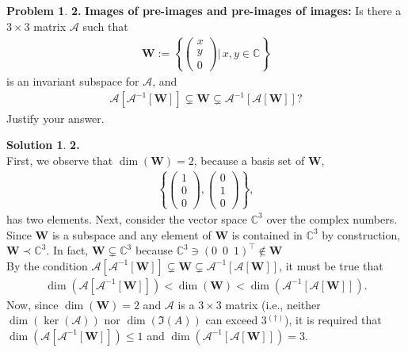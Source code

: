 \documentclass{book}
\theoremstyle{definition}
\newtheorem*{prob*}{Problem}
\newtheorem*{sln*}{Solution}
\newcommand{\W}{\mathbf{W}}
\begin{document}
\newpage
\begin{prob*}\textbf{2.}
	\textbf{Images of pre-images and pre-images of images:} Is there a $3\times 3$ matrix $\mathcal{A}$ such that
	\begin{align*}
	\W := \left\{ \begin{pmatrix}
	x\\y\\0
	\end{pmatrix}\bigg\vert \,x,y\in \mathbb{C} \right\}
	\end{align*}
	is an invariant subspace for $\mathcal{A}$, and
	\begin{align*}
	\mathcal{A}\left[ \mathcal{A}^{-1}[\W] \right] \subsetneq \W \subsetneq \mathcal{A}^{-1}\left[ \mathcal{A}[\W] \right]?
	\end{align*}
	Justify your answer.
	
	
	\begin{sln*}\textbf{2.}
		$\,$\\
		
		\noindent First, we observe that $\dim(\W) = 2$, because a basis set of $\W$,
		\begin{align*}
		\left\{ \begin{pmatrix}
		1\\0\\0
		\end{pmatrix},\begin{pmatrix}
		0\\1\\0
		\end{pmatrix}\right\},
		\end{align*}
		has two elements. Next, consider the vector space $\mathbb{C}^3$ over the complex numbers. Since $\W$ is a subspace and any element of $\W$ is contained in $\mathbb{C}^3$ by construction, $\W \prec \mathbb{C}^3$. In fact, $\W \subsetneq \mathbb{C}^3$ because $\mathbb{C}^3 \ni (0\,\,\,0\,\,\,1)^\top \notin\W$\\
		
		\noindent By the condition $\mathcal{A}\left[ \mathcal{A}^{-1}[\W] \right] \subsetneq \W \subsetneq \mathcal{A}^{-1}\left[ \mathcal{A}[\W] \right]$, it must be true that
		\begin{align*}
		\dim\left( \mathcal{A}\left[ \mathcal{A}^{-1}[\W] \right]   \right) < \dim(\W) < \dim\left(\mathcal{A}^{-1}\left[ \mathcal{A}[\W] \right]\right).
		\end{align*}
		Now, since $\dim(\W) = 2$ and $\mathcal{A}$ is a $3\times 3$ matrix (i.e., neither $\dim(\ker(\mathcal{A}))$ nor $\dim(\Im(A))$ can exceed 3$^{(\dagger)}$), it is required that $\dim\left( \mathcal{A}\left[ \mathcal{A}^{-1}[\W] \right]   \right) \leq 1$ and $\dim\left(\mathcal{A}^{-1}\left[ \mathcal{A}[\W] \right]\right) = 3$. \\
		

\end{sln*}
\end{prob*}
\end{document}
